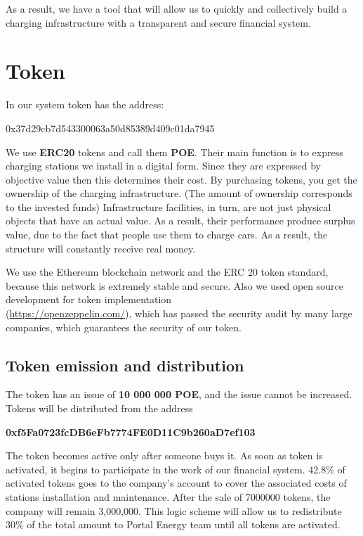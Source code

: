 \documentclass[a4paper,12pt]{report}
\newcommand{\contractAddress}{0x37d29cb7d543300063a50d85389d409c01da7945}
\begin{document}
As a result, we have a tool that will allow us to quickly and collectively build a charging infrastructure with a transparent and secure financial system.



\section{Token}

In our system  token has the address:

\contractAddress 

We use \textbf{ERC20} tokens and call them \textbf{POE}. Their main function is to express charging stations we install in a digital form. Since they are expressed by objective value then this  determines their cost.
By purchasing tokens, you get the ownership of the charging infrastructure. (The amount of ownership corresponds to the invested funds) Infrastructure facilities, in turn, are not just physical objects that have an actual value. As a result,  their performance produce surplus value, due to the fact that people use them to charge cars. As a result, the structure will constantly receive real money.

We use the Ethereum blockchain network and the ERC 20 token standard,
because this network is extremely stable and secure. Also we used open source development for token implementation \\ (\href{https://openzeppelin.com/}{https://openzeppelin.com/}), which has passed the security audit by many large companies, which guarantees the security of our token.




\subsection{Token emission and distribution}

The token has an issue of \textbf{10 000 000 POE}, and the issue cannot be increased. Tokens will be distributed from the address

\textbf{0xf5Fa0723fcDB6eFb7774FE0D11C9b260aD7ef103}

The token becomes active only after someone buys it. As soon as token is activated, it begins to participate in the work of our financial system. 42.8\% of activated tokens goes to the company's account to cover the associated costs of stations installation and maintenance. After the sale of 7000000 tokens, the company will remain 3,000,000. This logic scheme will allow us to redistribute 30\% of the total amount  to Portal Energy team until all tokens are activated.
\end{document}

